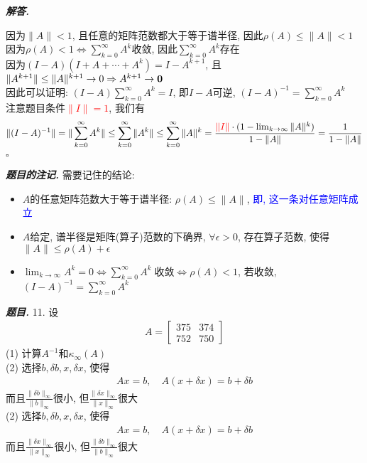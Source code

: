 \documentclass[10pt, a4paper, oneside]{ctexart}
\newcommand{\norm}[1]{\| #1 \|}
\newenvironment{problem}{\begin{framed}\par\noindent\textbf{\textit{题目. }}}{\end{framed}\par}
\newenvironment{solution}{%
  \par\noindent\textbf{\textit{解答. }}\ignorespaces
}{%
  \hfill\ensuremath{\square}\par %
}
\newenvironment{note}{\par\noindent\textbf{\textit{题目的注记. }}\ignorespaces}{\par}
\begin{document}
\begin{solution}
因为$\norm{A}<1$, 且任意的矩阵范数都大于等于谱半径, 因此$\rho(A)\leq \norm{A}<1$\\
因为$\rho(A)<1 \iff \sum_{k=0}^{\infty}A^k$收敛, 因此$ \sum_{k=0}^{\infty}A^k$存在\\
因为$(I-A)(I+A+\cdots+A^k)=I-A^{k+1}$, 且$\norm{A^{k+1}}\leq \norm{A}^{k+1}\to 0 \Rightarrow A^{k+1}\to \bf{0}$\\
因此可以证明: $(I-A)\sum_{k=0}^{\infty}A^k=I$, 即$I-A$可逆, $(I-A)^{-1}=\sum_{k=0}^{\infty}A^k$\\
注意题目条件\textcolor{red}{$\norm{I}=1$}, 我们有
\begin{align*}
    \norm{(I-A)^{-1}}=\norm{\sum_{k=0}^{\infty}A^k}\leq \sum_{k=0}^{\infty}\norm{A^k}\leq \sum_{k=0}^{\infty}\norm{A}^k=\frac{\textcolor{red}{\norm{I}}\cdot(1-\lim_{k\to \infty}\norm{A}^k)}{1-\norm{A}}=\frac{1}{1-\norm{A}}
\end{align*}
\end{solution}
\begin{note}
需要记住的结论:
\begin{itemize}
    \item $A$的任意矩阵范数大于等于谱半径: $\rho(A)\leq \norm{A}$, \textcolor{blue}{即, 这一条对任意矩阵成立}
    \item $A$给定, 谱半径是矩阵(算子)范数的下确界, $\forall \epsilon>0$, 存在算子范数, 使得$\norm{A}\leq \rho(A)+\epsilon$
    \item $\lim_{k\to \infty}A^k=0 \iff \sum_{k=0}^{\infty}A^k \;\text{收敛}\iff \rho(A)<1$, 若收敛, $(I-A)^{-1}=\sum_{k=0}^{\infty}A^k$
\end{itemize}
\end{note}

\begin{problem}
11. 设 
\begin{align*}
    A=\begin{bmatrix}
        375&374\\752&750
    \end{bmatrix}
\end{align*}
(1) 计算$A^{-1}$和$\kappa_{\infty}(A)$\\
(2) 选择$b,\delta b, x, \delta x$, 使得
\begin{align*}
    Ax=b, \quad A(x+\delta x)=b+\delta b
\end{align*}
而且$\frac{\norm{\delta b}_{\infty}}{\norm{ b}_{\infty}}$很小, 但$\frac{\norm{\delta x}_{\infty}}{\norm{x}_{\infty}}$很大\\
(2) 选择$b,\delta b, x, \delta x$, 使得
\begin{align*}
    Ax=b, \quad A(x+\delta x)=b+\delta b
\end{align*}
而且$\frac{\norm{\delta x}_{\infty}}{\norm{ x}_{\infty}}$很小, 但$\frac{\norm{\delta b}_{\infty}}{\norm{b}_{\infty}}$很大
\end{problem}
\end{document}
